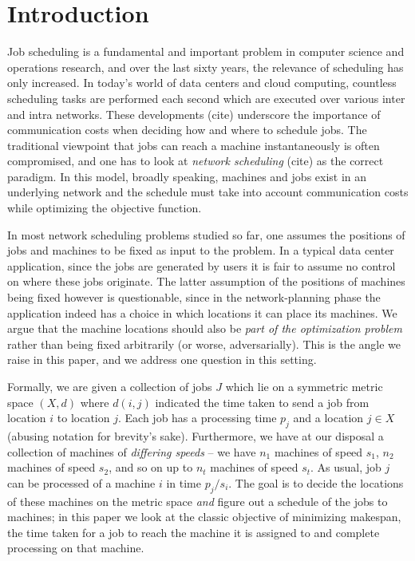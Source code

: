 \section{Introduction}
Job scheduling is a fundamental and important problem in computer science and operations research, and over the last sixty years, the relevance of scheduling has only increased. In today's world
of data centers and cloud computing, countless scheduling tasks are performed each second which are executed over various inter and intra networks. These developments (cite) underscore the importance of
communication costs when deciding how and where to schedule jobs. The traditional viewpoint that jobs can reach a machine instantaneously is often compromised, and one has to look at {\em network scheduling} (cite)
as the correct paradigm.  In this model, broadly speaking, machines and jobs exist in an underlying network and the schedule must take into account communication costs while optimizing the objective function.
\smallskip

In most network scheduling problems studied so far, one assumes the positions of jobs and machines to be fixed as input to the problem. In a typical data center application, since the jobs are generated by users it is fair to assume no control on where these
jobs originate. The latter assumption of the positions of machines being fixed however is questionable, since in the network-planning phase the application indeed has a choice in which locations it can place its machines. We argue that the machine locations should
also be {\em part of the optimization problem} rather than being fixed arbitrarily (or worse, adversarially). This is the angle we raise in this paper, and we address one question in this setting.
\smallskip

Formally, we are given a collection of jobs $J$ which lie on a symmetric metric space $(X,d)$ where $d(i,j)$ indicated the time taken to send a job from location $i$ to location $j$.
Each job has a processing time $p_j$ and a location $j \in X$ (abusing notation for brevity's sake). Furthermore, we have at our disposal a collection of machines of {\em differing speeds} -- we have $n_1$ machines of speed $s_1$, $n_2$ machines of speed $s_2$,
and so on up to $n_t$ machines of speed $s_t$. As usual, job $j$ can be processed of a machine $i$ in time $p_j/s_i$.
The goal is to decide the locations of these machines on the metric space {\em and} figure out a schedule of the jobs to machines; in this paper we look at the classic objective of minimizing makespan, the time taken for a job
to reach the machine it is assigned to and complete processing on that machine.

